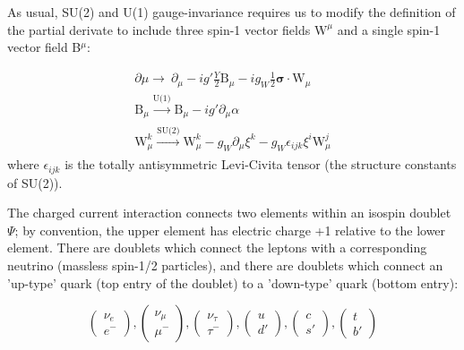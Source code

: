 As usual, SU(2) and U(1) gauge-invariance requires us to modify the definition of the partial derivate to include three spin-1 vector fields $\bm{\mathrm{W}}^{\mu}$ and a single spin-1 vector field B$^{\mu}$:

\begin{equation}
\begin{array}{l}
\partial{\mu} \rightarrow\ \partial_{\mu} - i g' \frac{Y}{2}\mathrm{B}_{\mu} -  i g_{W} \frac{1}{2}\bm{\sigma} \cdot \bm{\mathrm{W}}_{\mu}\\
\mathrm{B}_{\mu} \xrightarrow[]{\text{U(1)}} \mathrm{B}_{\mu} - i g' \partial_{\mu} \alpha \\
\mathrm{W}^{k}_{\mu} \xrightarrow[]{\text{SU(2)}} \mathrm{W}^{k}_{\mu} - g_{W} \partial_{\mu} \xi^{k} -  g_{W} \epsilon_{ijk} \xi^{i} \mathrm{W}^{j}_{\mu}
 \end{array}
\end{equation}
where $\epsilon_{ijk}$ is the totally antisymmetric Levi-Civita tensor (the structure constants of SU(2)).

The charged current interaction connects two elements within an isospin doublet $\Psi$; by convention, the upper element has electric charge +1 relative to the lower element. There are doublets which connect the leptons with a corresponding neutrino (massless spin-1/2 particles), and there are doublets which connect an 'up-type' quark (top entry of the doublet) to a 'down-type' quark (bottom entry):

\begin{equation*}
\begin{pmatrix} \nu_{e} \\ e^{-} \end{pmatrix},
\begin{pmatrix} \nu_{\mu} \\ \mu^{-} \end{pmatrix},
\begin{pmatrix} \nu_{\tau} \\ \tau^{-} \end{pmatrix},
\begin{pmatrix} u \\ d' \end{pmatrix},
\begin{pmatrix} c \\ s' \end{pmatrix},
\begin{pmatrix} t \\ b' \end{pmatrix}
\end{equation*}

